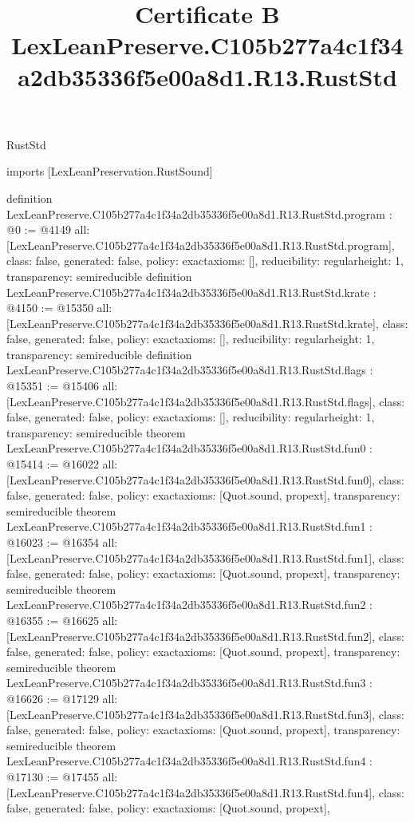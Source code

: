 \begin{lexlean}{RustStd}
\title{Certificate B LexLeanPreserve.C105b277a4c1f34a2db35336f5e00a8d1.R13.RustStd}
\begin{coremodule}
imports [LexLeanPreservation.RustSound]

definition LexLeanPreserve.C105b277a4c1f34a2db35336f5e00a8d1.R13.RustStd.program : @0 := @4149 {
  all: [LexLeanPreserve.C105b277a4c1f34a2db35336f5e00a8d1.R13.RustStd.program],
  class: false,
  generated: false,
  policy: exact{axioms: []},
  reducibility: regular{height: 1},
  transparency: semireducible
}
definition LexLeanPreserve.C105b277a4c1f34a2db35336f5e00a8d1.R13.RustStd.krate : @4150 := @15350 {
  all: [LexLeanPreserve.C105b277a4c1f34a2db35336f5e00a8d1.R13.RustStd.krate],
  class: false,
  generated: false,
  policy: exact{axioms: []},
  reducibility: regular{height: 1},
  transparency: semireducible
}
definition LexLeanPreserve.C105b277a4c1f34a2db35336f5e00a8d1.R13.RustStd.flags : @15351 := @15406 {
  all: [LexLeanPreserve.C105b277a4c1f34a2db35336f5e00a8d1.R13.RustStd.flags],
  class: false,
  generated: false,
  policy: exact{axioms: []},
  reducibility: regular{height: 1},
  transparency: semireducible
}
theorem LexLeanPreserve.C105b277a4c1f34a2db35336f5e00a8d1.R13.RustStd.fun0 : @15414 := @16022 {
  all: [LexLeanPreserve.C105b277a4c1f34a2db35336f5e00a8d1.R13.RustStd.fun0],
  class: false,
  generated: false,
  policy: exact{axioms: [Quot.sound, propext]},
  transparency: semireducible
}
theorem LexLeanPreserve.C105b277a4c1f34a2db35336f5e00a8d1.R13.RustStd.fun1 : @16023 := @16354 {
  all: [LexLeanPreserve.C105b277a4c1f34a2db35336f5e00a8d1.R13.RustStd.fun1],
  class: false,
  generated: false,
  policy: exact{axioms: [Quot.sound, propext]},
  transparency: semireducible
}
theorem LexLeanPreserve.C105b277a4c1f34a2db35336f5e00a8d1.R13.RustStd.fun2 : @16355 := @16625 {
  all: [LexLeanPreserve.C105b277a4c1f34a2db35336f5e00a8d1.R13.RustStd.fun2],
  class: false,
  generated: false,
  policy: exact{axioms: [Quot.sound, propext]},
  transparency: semireducible
}
theorem LexLeanPreserve.C105b277a4c1f34a2db35336f5e00a8d1.R13.RustStd.fun3 : @16626 := @17129 {
  all: [LexLeanPreserve.C105b277a4c1f34a2db35336f5e00a8d1.R13.RustStd.fun3],
  class: false,
  generated: false,
  policy: exact{axioms: [Quot.sound, propext]},
  transparency: semireducible
}
theorem LexLeanPreserve.C105b277a4c1f34a2db35336f5e00a8d1.R13.RustStd.fun4 : @17130 := @17455 {
  all: [LexLeanPreserve.C105b277a4c1f34a2db35336f5e00a8d1.R13.RustStd.fun4],
  class: false,
  generated: false,
  policy: exact{axioms: [Quot.sound, propext]},
}
\end{coremodule}
\end{lexlean}
